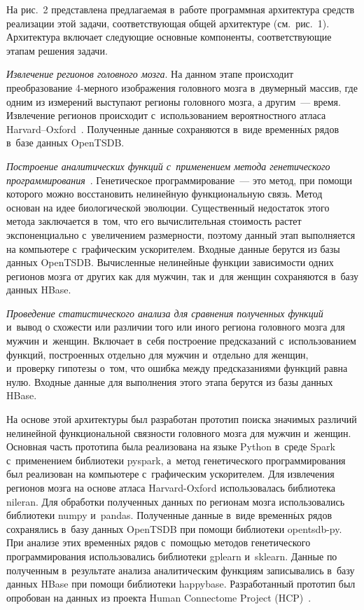 \begin{multicols}{2}
    
    На рис.~2 представлена предлагаемая в~работе программная архитектура 
средств реализации этой задачи, соответствующая общей архитектуре 
(см.\ рис.~1). Архитектура включает следующие основные компоненты, 
соответствующие этапам решения задачи.
    
    \textit{Извлечение регионов головного мозга}. На данном этапе 
происходит преобразование 4-мерного изоб\-ра\-же\-ния головного мозга 
в~двумерный массив, где одним из измерений выступают регионы головного 
мозга, а другим~--- время. Извлечение регионов происходит 
с~использованием вероятностного атласа Harvard--Oxford~\cite{8-st}. 
Полученные данные сохраняются в~виде временн$\acute{\mbox{ы}}$х рядов в~базе данных 
OpenTSDB.
    
    \textit{Построение аналитических функций с~применением метода 
генетического программирования}~\cite{9-st}. Генетическое 
программирование~--- это метод, при помощи которого можно восстановить 
нелинейную функциональную связь. Метод основан на идее биологической 
эволюции. Существенный недостаток этого метода заключается в~том, что 
его вычислительная стоимость растет экспоненциально с~увеличением 
размерности, поэтому данный этап выполняется на компьютере 
с~графическим ускорителем. Входные данные берутся из базы данных 
OpenTSDB. Вычисленные нелинейные функции зависимости одних регионов 
мозга от других как для мужчин, так и~для женщин сохраняются в~базу 
данных HBase.
    
    \textit{Проведение статистического анализа для сравнения полученных 
функций} и~вывод о схожести или различии того или иного региона 
головного мозга для мужчин и~женщин. Включает в~себя по\-стро\-ение 
предсказаний с~использованием функций, построенных отдельно для мужчин 
и~отдельно для женщин, и~проверку гипотезы о~том, что ошибка между 
предсказаниями функций рав\-на нулю. Входные данные для выполнения 
этого этапа берутся из базы данных HBase.
    
    На основе этой архитектуры был разработан прототип поиска значимых 
различий нелинейной функциональной связности головного мозга для 
мужчин и~женщин. Основная часть прототипа была реализована на языке 
Python в~среде Spark с~применением библиотеки pyspark, а~метод 
генетического программирования был реализован на компьютере 
с~графическим ускорителем. Для извлечения регионов мозга на основе 
атласа Harvard-Oxford использовалась библиотека nileran. Для обработки 
полученных данных по регионам мозга использовались библиотеки numpy 
и~pandas. Полученные данные в~виде временн$\acute{\mbox{ы}}$х рядов сохранялись в~базу 
данных OpenTSDB при помощи библиотеки opentsdb-py. При анализе этих 
временн$\acute{\mbox{ы}}$х рядов с~помощью методов генетического программирования 
использовались библиотеки gplearn и~sklearn. Данные по полученным 
в~результате анализа аналитическим функциям записывались в~базу данных 
HBase при помощи библиотеки happybase. Разработанный прототип был 
опробован на данных из проекта Human Connectome Project  
(HCP)~\cite{10-st}.


\end{multicols}
